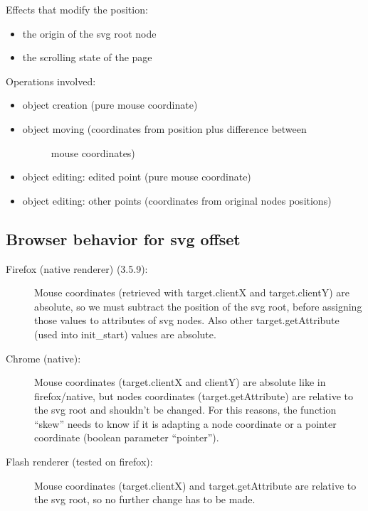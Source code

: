 \documentclass[10pt,a4paper,english]{book}
\begin{document}
Effects that modify the position:
\begin{itemize}
\item {} 
the origin of the svg root node

\item {} 
the scrolling state of the page

\end{itemize}

Operations involved:
\begin{itemize}
\item {} 
object creation (pure mouse coordinate)

\item {} \begin{description}
\item[{object moving (coordinates from position plus difference between}] \leavevmode 
mouse coordinates)

\end{description}

\item {} 
object editing: edited point (pure mouse coordinate)

\item {} 
object editing: other points (coordinates from original nodes positions)

\end{itemize}



\hypertarget{browser-behavior-for-svg-offset}{}
\subsection{Browser behavior for svg offset}
\label{browser-behavior-for-svg-offset}
\begin{description}
\item[{Firefox (native renderer) (3.5.9):}] \leavevmode 
Mouse coordinates (retrieved with target.clientX and target.clientY)
are absolute, so we must subtract the position of the svg root,
before assigning those values to attributes of svg nodes. Also other
target.getAttribute (used into init{\_}start) values are absolute.

\item[{Chrome (native):}] \leavevmode 
Mouse coordinates (target.clientX and clientY) are absolute like in
firefox/native, but nodes coordinates (target.getAttribute) are
relative to the svg root and shouldn't be changed. For this reasons,
the function ``skew'' needs to know if it is adapting a node
coordinate or a pointer coordinate (boolean parameter ``pointer'').

\item[{Flash renderer (tested on firefox):}] \leavevmode 
Mouse coordinates (target.clientX) and target.getAttribute are
relative to the svg root, so no further change has to be made.

\end{description}
\end{document}
